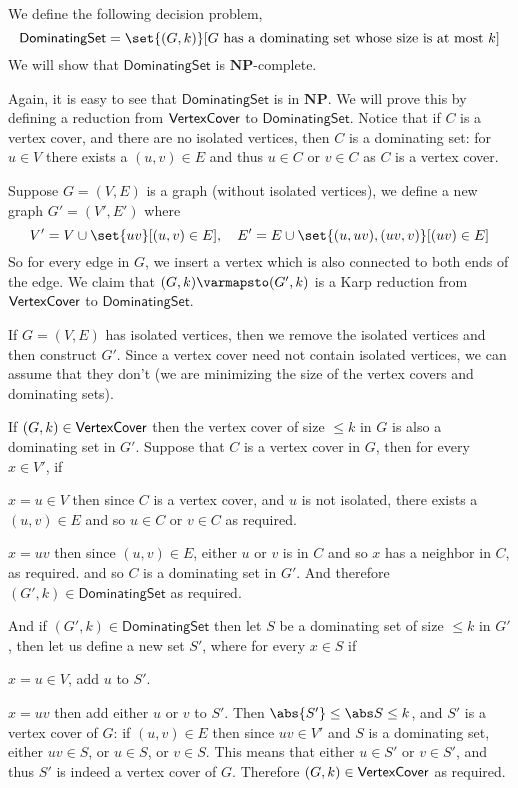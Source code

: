 \documentclass[10pt]{article}
\def\NP{\mathbf{NP}}
\begin{document}
\def\domset{\mathsf{DominatingSet}}
\begin{exam*}

    We define the following decision problem,
    \[ \domset = \set{(G,k)}[\text{$G$ has a dominating set whose size is at most $k$}] \]
    We will show that $\domset$ is $\NP$-complete.

    Again, it is easy to see that $\domset$ is in $\NP$.
    We will prove this by defining a reduction from $\mathsf{VertexCover}$ to $\domset$.
    Notice that if $C$ is a vertex cover, and there are no isolated vertices, then $C$ is a dominating set: for $u\in V$ there exists a $(u,v)\in E$ and thus $u\in C$ or $v\in C$ as $C$ is a vertex cover.

    Suppose $G=(V,E)$ is a graph (without isolated vertices), we define a new graph $G'=(V',E')$ where
    \[ V' = V\cup\set{uv}[(u,v)\in E],\quad E'=E\cup\set{(u,uv),(uv,v)}[(uv)\in E] \]
    So for every edge in $G$, we insert a vertex which is also connected to both ends of the edge.
    We claim that $(G,k)\varmapsto(G',k)$ is a Karp reduction from $\mathsf{VertexCover}$ to $\domset$.

    If $G=(V,E)$ has isolated vertices, then we remove the isolated vertices and then construct $G'$.
    Since a vertex cover need not contain isolated vertices, we can assume that they don't (we are minimizing the size of the vertex covers and dominating sets).

    If $(G,k)\in\mathsf{VertexCover}$ then the vertex cover of size $\leq k$ in $G$ is also a dominating set in $G'$.
    Suppose that $C$ is a vertex cover in $G$, then for every $x\in V'$, if
    \benum
        \item $x=u\in V$ then since $C$ is a vertex cover, and $u$ is not isolated, there exists a $(u,v)\in E$ and so $u\in C$ or $v\in C$ as required.
        \item $x=uv$ then since $(u,v)\in E$, either $u$ or $v$ is in $C$ and so $x$ has a neighbor in $C$, as required.
    \eenum
    and so $C$ is a dominating set in $G'$.
    And therefore $(G',k)\in\domset$ as required.

    And if $(G',k)\in\domset$ then let $S$ be a dominating set of size $\leq k$ in $G'$, then let us define a new set $S'$, where for every $x\in S$ if
    \benum
        \item $x=u\in V$, add $u$ to $S'$.
        \item $x=uv$ then add either $u$ or $v$ to $S'$.
    \eenum
    Then $\abs{S'}\leq\abs S\leq k$, and $S'$ is a vertex cover of $G$: if $(u,v)\in E$ then since $uv\in V'$ and $S$ is a dominating set, either $uv\in S$, or $u\in S$, or $v\in S$.
    This means that either $u\in S'$ or $v\in S'$, and thus $S'$ is indeed a vertex cover of $G$.
    Therefore $(G,k)\in\mathsf{VertexCover}$ as required.

\end{exam*}
\end{document}
